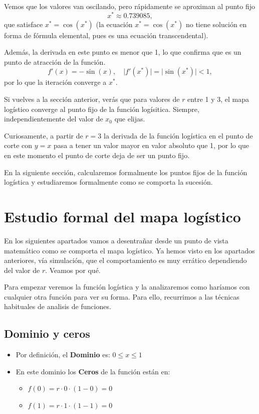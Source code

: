 \documentclass[
  11pt,
  a4paper,
  DIV=11,
  numbers=noendperiod]{scrreprt}
\providecommand{\tightlist}{%
  \setlength{\itemsep}{0pt}\setlength{\parskip}{0pt}}
\begin{document}
Vemos que los valores van oscilando, pero rápidamente se aproximan al
punto fijo \[
x^* \approx 0.739085,
\] que satisface \(x^* = \cos(x^*)\) (la ecuación \(x^* = \cos(x^*)\) no
tiene solución en forma de fórmula elemental, pues es una ecuación
transcendental).

Además, la derivada en este punto es menor que 1, lo que confirma que es
un punto de atracción de la función. \[
f'(x) = -\sin(x),
\quad
\lvert f'(x^*)\rvert = \lvert\sin(x^*)\rvert < 1,
\] por lo que la iteración converge a \(x^*\).

Si vuelves a la sección anterior, verás que para valores de \(r\) entre
1 y 3, el mapa logístico converge al punto fijo de la función
logísitica. Siempre, independientemente del valor de \(x_0\) que elijas.

Curiosamente, a partir de \(r=3\) la derivada de la función logística en
el punto de corte con \(y=x\) pasa a tener un valor mayor en valor
absoluto que 1, por lo que en este momento el punto de corte deja de ser
un punto fijo.

En la siguiente sección, calcularemos formalmente los puntos fijos de la
función logística y estudiaremos formalmente como se comporta la
sucesión.

\chapter{Estudio formal del mapa
logístico}\label{estudio-formal-del-mapa-loguxedstico}

En los siguientes apartados vamos a desentrañar desde un punto de vista
matemático como se comporta el mapa logístico. Ya hemos visto en los
apartados anteriores, vía simulación, que el comportamiento es muy
errático dependiendo del valor de \(r\). Veamos por qué.

Para empezar veremos la función logística y la analizaremos como
haríamos con cualquier otra función para ver su forma. Para ello,
recurrimos a las técnicas habituales de analisis de funciones.

\section{Dominio y ceros}\label{dominio-y-ceros}

\begin{itemize}
\tightlist
\item
  Por definición, el \textbf{Dominio} es: \(0 \le x \le 1\)\\
\item
  En este dominio los \textbf{Ceros} de la función están en:

  \begin{itemize}
  \tightlist
  \item
    \(f(0) = r \cdot 0 \cdot (1-0) = 0\)\\
  \item
    \(f(1) = r \cdot 1 \cdot (1-1) = 0\)
  \end{itemize}
\end{itemize}
\end{document}
